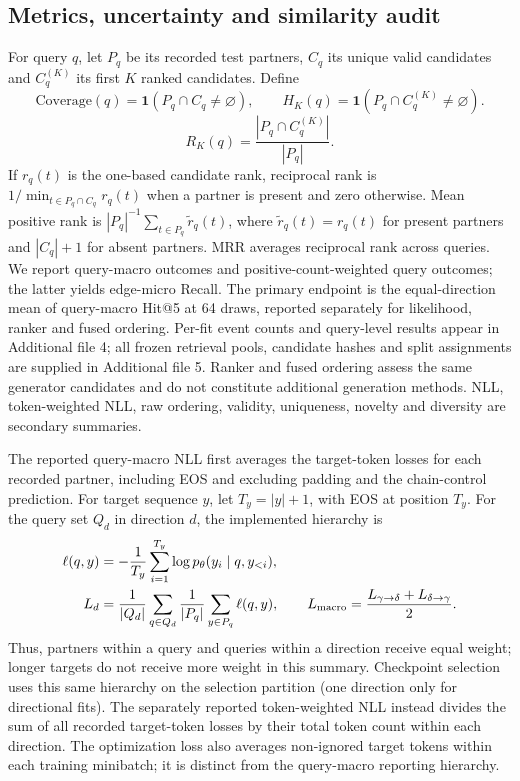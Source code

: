\documentclass[12pt]{article}
\begin{document}
\subsection{Metrics, uncertainty and similarity audit}
For query $q$, let $P_q$ be its recorded test partners, $C_q$ its unique valid
candidates and $C_q^{(K)}$ its first $K$ ranked candidates. Define
\begin{equation}
\mathrm{Coverage}(q)=\mathbf{1}(P_q\cap C_q\ne\varnothing),\qquad
H_K(q)=\mathbf{1}(P_q\cap C_q^{(K)}\ne\varnothing).
\end{equation}
\begin{equation}
R_K(q)=\frac{|P_q\cap C_q^{(K)}|}{|P_q|}.
\end{equation}
If $r_q(t)$ is the one-based candidate rank, reciprocal rank is
$1/\min_{t\in P_q\cap C_q}r_q(t)$ when a partner is present and zero otherwise.
Mean positive rank is $|P_q|^{-1}\sum_{t\in P_q}\widetilde r_q(t)$,
where $\widetilde r_q(t)=r_q(t)$ for present partners and $|C_q|+1$ for absent
partners. MRR averages reciprocal rank across queries. We report query-macro outcomes and positive-count-weighted query
outcomes; the latter yields edge-micro Recall. The primary endpoint is the
equal-direction mean of query-macro Hit@5 at 64 draws, reported separately for
likelihood, ranker and fused ordering. Per-fit event counts and query-level results appear in Additional file 4;
all frozen retrieval pools, candidate hashes and split assignments are supplied
in Additional file 5. Ranker and fused ordering assess the same generator
candidates and do not constitute additional generation methods.
NLL, token-weighted NLL, raw ordering,
validity, uniqueness, novelty and diversity are secondary summaries.

The reported query-macro NLL first averages the target-token losses for each
recorded partner, including EOS and excluding padding and the chain-control
prediction. For target sequence $y$, let $T_y=|y|+1$, with EOS at position $T_y$.
For the query set $Q_d$ in direction $d$, the implemented hierarchy is
\begin{align}
\ell(q,y)&=-\frac{1}{T_y}\sum_{i=1}^{T_y}
 \log p_\theta(y_i\mid q,y_{<i}),\\
L_d&=\frac{1}{|Q_d|}\sum_{q\in Q_d}
 \frac{1}{|P_q|}\sum_{y\in P_q}\ell(q,y),\qquad
L_{\rm macro}=\frac{L_{\gamma\rightarrow\delta}
 +L_{\delta\rightarrow\gamma}}{2}.
\end{align}
Thus, partners within a query and queries within a direction receive equal
weight; longer targets do not receive more weight in this summary.
Checkpoint selection uses this same hierarchy on the selection partition
(one direction only for directional fits).
The separately reported token-weighted NLL instead divides the sum of all
recorded target-token losses by their total token count within each direction.
The optimization loss also averages non-ignored target tokens within each
training minibatch; it is distinct from the query-macro reporting hierarchy.
\end{document}

